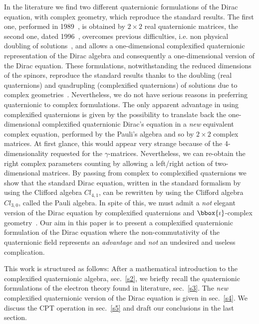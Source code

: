 In the literature we find two different quaternionic formulations of the 
Dirac equation, with complex geometry, which reproduce the standard results. 
The first one, performed 
in 1989~\cite{R}, is obtained by $2\times 2$ real quaternionic 
matrices, 
the second one, dated 1996~\cite{D}, overcomes previous 
difficulties, i.e. 
non physical doubling of solutions~\cite{DS,DS1}, 
and allows a one-dimensional complexified
quaternionic  representation of the Dirac algebra and 
consequently a one-dimensional 
version of the Dirac 
equation. These formulations, notwithstanding the reduced dimensions of the
spinors, reproduce the standard results thanks to the  doubling 
(real quaternions) and quadrupling (complexified quaternions) of solutions
due to complex geometries~\cite{DR}. Nevertheless, we do not have serious 
reasons in  
preferring quaternionic to complex formulations. The only apparent advantage in
using complexified quaternions is given by the possibility to translate back
the one-dimensional complexified quaternionic Dirac's equation in a {\em new} 
equivalent complex equation, performed by the Pauli's algebra and so by 
$2\times 2$ complex matrices. At first glance, this would appear very strange 
because of the 4-dimensionality requested for the $\gamma$-matrices.  
Nevertheless, we can re-obtain the right complex parameters counting by allowing
a left/right action of two-dimensional matrices. 
By passing from complex to complexified quaternions we show that the 
standard Dirac equation, written in the standard formalism by using 
the Clifford 
algebra $Cl_{4,1}$, can be rewritten by using the Clifford algebra
$Cl_{3,0}$\cite{Z}, called the Pauli algebra.  In spite
of this, we must admit a {\em not} elegant version of the Dirac equation by 
complexified quaternions and $\bbox{\iota}$-complex geometry~\cite{D}.  
Our aim in this paper is to present a complexified quaternionic formulation
of the Dirac equation where the non-commutativity of the quaternionic field
represents an {\em advantage} and {\em not} an undesired and useless 
complication.

This work is structured as follows: After a mathematical introduction to the 
complexified quaternionic algebra, sec.~\ref{s2}, we briefly recall the 
quaternionic formulations of the electron theory found in literature, 
sec.~\ref{s3}. The {\em new} complexified quaternionic version of the Dirac 
equation is given in sec.~\ref{s4}. We discuss the CPT operation in 
sec.~\ref{s5} and draft our conclusions in the last section.


